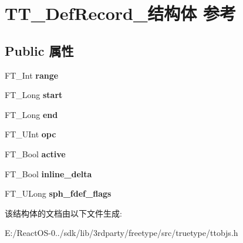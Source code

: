 \hypertarget{struct_t_t___def_record__}{}\section{T\+T\+\_\+\+Def\+Record\+\_\+结构体 参考}
\label{struct_t_t___def_record__}
\subsection*{Public 属性}
\begin{DoxyCompactItemize}
\item 
\mbox{\label{struct_t_t___def_record___a9367042106b21f85e0437e532182783f}} 
F\+T\+\_\+\+Int {\bfseries range}
\item 
\mbox{\label{struct_t_t___def_record___a50285a2b7650de2f6d9a2d76c1fdd51a}} 
F\+T\+\_\+\+Long {\bfseries start}
\item 
\mbox{\label{struct_t_t___def_record___a71f3869e43adc43ae1ae2da56bf76df3}} 
F\+T\+\_\+\+Long {\bfseries end}
\item 
\mbox{\label{struct_t_t___def_record___a6dbab99d44b7d4556247bfdb55091a9e}} 
F\+T\+\_\+\+U\+Int {\bfseries opc}
\item 
\mbox{\label{struct_t_t___def_record___a8bc47104c63a35c0f0fd0d5e7c969392}} 
F\+T\+\_\+\+Bool {\bfseries active}
\item 
\mbox{\label{struct_t_t___def_record___ab58bc5152cdcc5f2e435eb86b88a920e}} 
F\+T\+\_\+\+Bool {\bfseries inline\+\_\+delta}
\item 
\mbox{\label{struct_t_t___def_record___a3d3185b062355f7ff270eee9511e1f3f}} 
F\+T\+\_\+\+U\+Long {\bfseries sph\+\_\+fdef\+\_\+flags}
\end{DoxyCompactItemize}


该结构体的文档由以下文件生成\+:\begin{DoxyCompactItemize}
\item 
E\+:/\+React\+O\+S-\/0../sdk/lib/3rdparty/freetype/src/truetype/ttobjs.\+h\end{DoxyCompactItemize}
